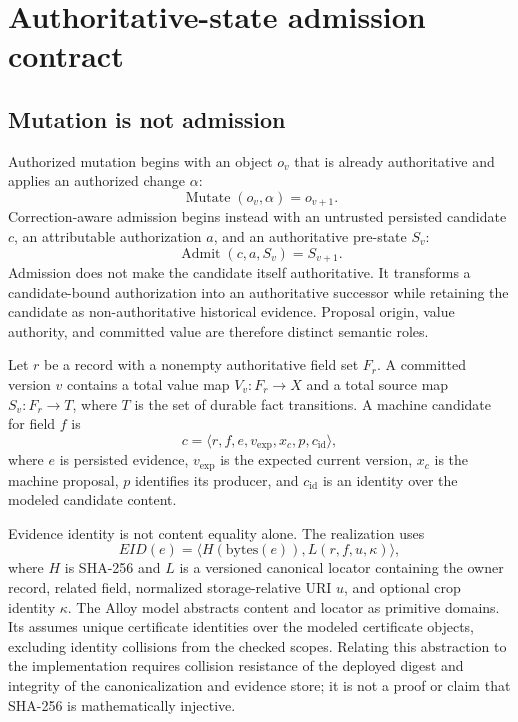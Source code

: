 \section{Authoritative-state admission contract}
\label{sec:contract}

\subsection{Mutation is not admission}

Authorized mutation begins with an object $o_v$ that is already authoritative and applies an authorized change $\alpha$:
\begin{equation}
\operatorname{Mutate}(o_v,\alpha)=o_{v+1}.
\end{equation}
Correction-aware admission begins instead with an untrusted persisted candidate $c$, an attributable authorization $a$, and an authoritative pre-state $S_v$:
\begin{equation}
\operatorname{Admit}(c,a,S_v)=S_{v+1}.
\label{eq:admit}
\end{equation}
Admission does not make the candidate itself authoritative. It transforms a candidate-bound authorization into an authoritative successor while retaining the candidate as non-authoritative historical evidence. Proposal origin, value authority, and committed value are therefore distinct semantic roles.

Let $r$ be a record with a nonempty authoritative field set $F_r$. A committed version $v$ contains a total value map $V_v:F_r\rightarrow X$ and a total source map $S_v:F_r\rightarrow T$, where $T$ is the set of durable fact transitions. A machine candidate for field $f$ is
\begin{equation}
c=\langle r,f,e,v_{\mathrm{exp}},x_c,p,c_{\mathrm{id}}\rangle,
\label{eq:candidate}
\end{equation}
where $e$ is persisted evidence, $v_{\mathrm{exp}}$ is the expected current version, $x_c$ is the machine proposal, $p$ identifies its producer, and $c_{\mathrm{id}}$ is an identity over the modeled candidate content.

Evidence identity is not content equality alone. The realization uses
\begin{equation}
EID(e)=\langle H(\mathrm{bytes}(e)),L(r,f,u,\kappa)\rangle,
\label{eq:evidence}
\end{equation}
where $H$ is SHA-256 and $L$ is a versioned canonical locator containing the owner record, related field, normalized storage-relative URI $u$, and optional crop identity $\kappa$. The Alloy model abstracts content and locator as primitive domains. Its  assumes unique certificate identities over the modeled certificate objects, excluding identity collisions from the checked scopes. Relating this abstraction to the implementation requires collision resistance of the deployed digest and integrity of the canonicalization and evidence store; it is not a proof or claim that SHA-256 is mathematically injective.

